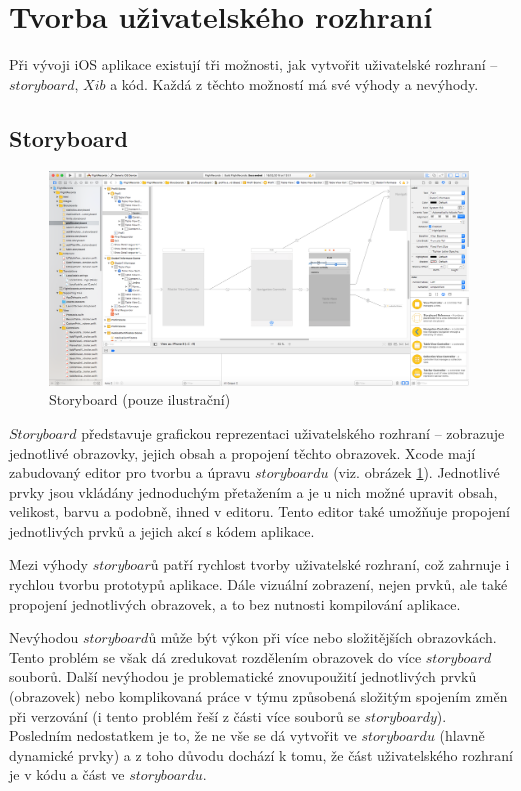 \documentclass[thesis=M,czech]{FITthesis}[2012/06/26]
\begin{document}
\section{Tvorba uživatelského rozhraní}
Při vývoji iOS aplikace existují tři možnosti, jak vytvořit uživatelské rozhraní -- $storyboard$, $Xib$ a kód. Každá z těchto možností má své výhody a nevýhody. \cite{iOSUI}

\subsection{Storyboard}

\begin{figure}[]\centering
 \includegraphics[width=0.99\textwidth]{./pictures/storyboard}
 \caption[Storyboard]{Storyboard (pouze ilustrační)}\label{fig:SB}
\end{figure}

$Storyboard$ představuje grafickou reprezentaci uživatelského rozhraní -- zobrazuje jednotlivé obrazovky, jejich obsah a propojení těchto obrazovek. Xcode mají zabudovaný editor pro tvorbu a úpravu $storyboardu$ (viz. obrázek \ref{fig:SB}). Jednotlivé prvky jsou vkládány jednoduchým přetažením a je u nich možné upravit obsah, velikost, barvu a podobně, ihned v editoru. Tento editor také umožňuje propojení jednotlivých prvků a jejich akcí s kódem aplikace. \cite{SB}

Mezi výhody $storyboarů$ patří rychlost tvorby uživatelské rozhraní, což zahrnuje i rychlou tvorbu prototypů aplikace. Dále vizuální zobrazení, nejen prvků, ale také propojení jednotlivých obrazovek, a to bez nutnosti kompilování aplikace. 

Nevýhodou $storyboardů$ může být výkon při více nebo složitějších obrazovkách. Tento problém se však dá zredukovat rozdělením obrazovek do více $storyboard$ souborů. Další nevýhodou je problematické znovupoužití jednotlivých prvků (obrazovek) nebo komplikovaná práce v týmu způsobená složitým spojením změn při verzování (i tento problém řeší z části více souborů se $storyboardy$). Posledním nedostatkem je to, že ne vše se dá vytvořit ve $storyboardu$ (hlavně dynamické prvky) a z toho důvodu dochází k tomu, že část uživatelského rozhraní je v kódu a část ve $storyboardu$. \cite{iOSUI} \cite{dominik}
\end{document}
